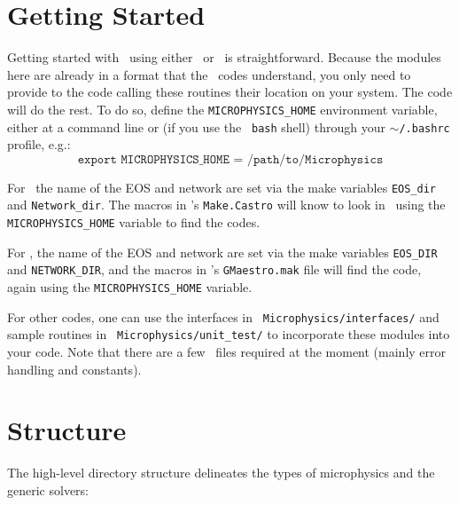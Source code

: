 \section{Getting Started}

Getting started with \microphysics\ using either \castro\ or
\maestro\ is straightforward. Because the modules here are already in
a format that the \boxlib\ codes understand, you only need to provide
to the code calling these routines their location on your system. The
code will do the rest. To do so, define the {\tt MICROPHYSICS\_HOME}
environment variable, either at a command line or (if you use the {\tt
  bash} shell) through your {\tt $\sim$/.bashrc} profile, e.g.:
\begin{equation*}
  \texttt{export MICROPHYSICS\_HOME = /path/to/Microphysics}
\end{equation*}

For \castro\, the name of the EOS and network are set via the make
variables {\tt EOS\_dir} and {\tt Network\_dir}.  The macros in
\castro's {\tt Make.Castro} will know to look in \microphysics\ using
the {\tt MICROPHYSICS\_HOME} variable to find the codes.

For \maestro, the name of the EOS and network are set via the make
variables {\tt EOS\_DIR} and {\tt NETWORK\_DIR}, and the macros in
\maestro's {\tt GMaestro.mak} file will find the code, again using the
           {\tt MICROPHYSICS\_HOME} variable.

For other codes, one can use the interfaces in {\tt
  Microphysics/interfaces/} and sample routines in {\tt
  Microphysics/unit\_test/} to incorporate these modules into your
code.  Note that there are a few \boxlib\ files required at the moment
(mainly error handling and constants).

\section{Structure}

The high-level directory structure delineates the types of microphysics
and the generic solvers:


